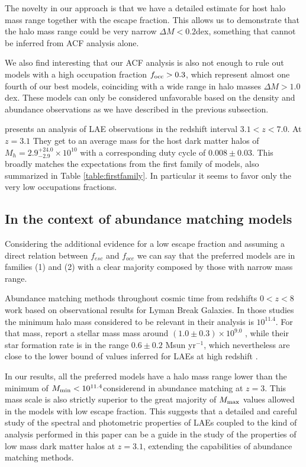 \documentclass[usenatbib]{mn2e}
\newcommand{\hMsun}{{\ifmmode{h^{-1}{\rm
        {M_{\odot}}}}\else{$h^{-1}{\rm{M_{\odot}}}$}\fi}}
\begin{document}
The novelty in our approach is that we have a detailed estimate for 
host halo mass range together with the escape fraction. This allows us
to demonstrate that the halo mass range could be very narrow $\Delta M <
0.2$dex, something that cannot be inferred from ACF analysis
alone. 

We also find interesting that our ACF analysis is also not enough to rule
out models with a high occupation fraction $f_{\rm occ}>0.3$, which
represent almost one fourth of our best models, coinciding with a wide
range in halo masses $\Delta M>1.0$ dex. These models can only be
considered unfavorable based on the density and abundance observations
as we have described in the previous subsection.


\cite{Ouchi2010} presents an analysis of LAE observations in the
redshift interval $3.1<z<7.0$. At $z=3.1$ They get to an average
mass for the host dark matter halos of $M_{h}=2.9^{+24.0}_{-2.9}\times
10^{10}$ \hMsun with a corresponding duty cycle of $0.008\pm
0.03$. This broadly matches the expectations from the first family of
models, also summarized in Table \ref{table:firstfamily}. In
particular it seems to favor only the very low occupations fractions.  




\subsection{In the context of abundance matching models}


Considering the additional evidence for a low escape fraction and 
assuming a direct relation between $f_{esc}$ and $f_{occ}$ we can
say that the preferred models are in families (1) and (2) with a
clear majority composed by those with narrow mass range.

Abundance matching methods throughout cosmic time from redshifts
$0<z<8$ \cite{Behroozi2013a,Behroozi2013b} work based on observational
results for Lyman Break Galaxies. In those studies the minimum halo
mass considered to be relevant in their analysis is
$10^{11.4}$\hMsun. For that mass, \cite{Behroozi2013a} report a
stellar mass mass around $(1.0\pm0.3)\times 10^{9.0}$
\hMsun, while their star formation rate is in the range $0.6\pm 0.2$
Msun yr$^{-1}$, which nevertheless are close to the lower bound of
values inferred for LAEs at high redshift
\citep{Gawiser2007,Nilsson2009,Pentericci2009}.  





In our results, all the preferred models have a halo mass range lower
than the minimum of $M_{\rm min}<10^{11.4}$\hMsun considerend in
abundance matching at $z=3$. This mass scale is also strictly superior to
the great majority of  $M_{\rm max}$ values allowed in the models with
low escape fraction.   This suggests that a detailed and careful study
of the spectral and photometric properties of LAEs coupled to the kind
of analysis performed in this paper can be a guide in the study of the
properties of low mass dark matter halos at $z=3.1$, extending the
capabilities of abundance matching methods.
\end{document}
